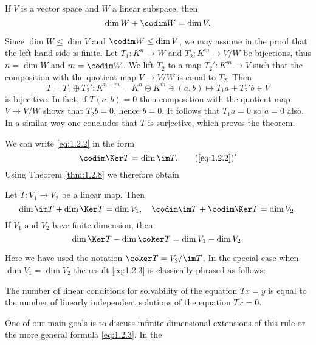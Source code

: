 \begin{thm}\label{thm:1.2.8}
  If $V$ is a vector space and $W$ a linear subspace, then
  \begin{displaymath}
    \dim W+\codim W=\dim V.
  \end{displaymath}
  \begin{prf}
    Since $\dim W\leq\dim V$ and $\codim W\leq\dim V$, we may
    assume in the proof that the left hand side is finite. Let
    $T_1:K^n\to W$ and $T_2:K^m\to V/W$ be bijections, thus $n=\dim W$
    and $m=\codim W$. We lift $T_2$ to a map $T_2':K^m\to V$
    such that the composition with the quotient map $V\to V/W$ is
    equal to $T_2$. Then
    \begin{displaymath}
      T=T_1\oplus T_2':K^{n+m}=K^n\oplus K^m\ni (a,b)\mapsto
      T_1a+T_2'b\in V
    \end{displaymath}
    is bijecitive. In fact, if $T(a,b)=0$ then composition with the
    quotient map $V\to V/W$ shows that $T_2b=0$, hence $b=0$. It
    follows that $T_1a=0$ so $a=0$ also. In a similar way one
    concludes that $T$ is surjective, which proves the theorem.
  \end{prf}
\end{thm}
We can write \eqref{eq:1.2.2} in the form
\begin{equation*}
  \codim \Ker T=\dim\im T.\tag*{$(\ref{eq:1.2.2})'$}
\end{equation*}
Using Theorem \ref{thm:1.2.8} we therefore obtain
\begin{thm}\label{thm:1.2.9}
  Let $T:V_1\to V_2$ be a linear map. Then
  \begin{displaymath}
    \dim\im T+\dim\Ker T=\dim V_1,\quad\codim \im
    T+\codim \Ker T=\dim V_2.
  \end{displaymath}
If $V_1$ and $V_2$ have finite dimension, then
\begin{equation}
  \label{eq:1.2.3}
  \dim\Ker T-\dim\coker T=\dim V_1-\dim V_2.
\end{equation}
\end{thm}
Here we have used the notation $\coker T=V_2/\im T$. In the
special case when $\dim V_1=\dim V_2$ the result \eqref{eq:1.2.3} is
classically phrased as follows:\par
The number of linear conditions for solvability of the equation $Tx=y$
is equal to the number of linearly independent solutions of the
equation $Tx=0$.\par
One of our main goals is to discuss infinite dimensional extensions of
this rule or the more general formula \eqref{eq:1.2.3}. In the
